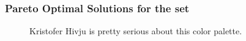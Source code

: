 \begin{frame}
  \frametitle{Pareto Optimal Solutions for the \gls{set}}
        
  \begin{figure}[htbp!]
    \begin{center}
      \resizebox{\columnwidth}{!}{}
    \end{center}
          \caption{Kristofer Hivju is pretty serious about this color palette.}
    \label{fig:full_set_pcp}
  \end{figure}
\end{frame}
